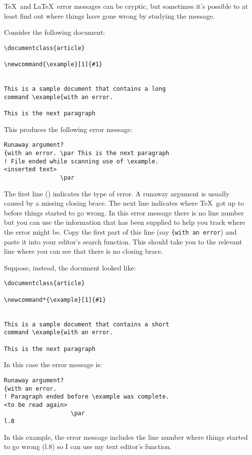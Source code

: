 \TeX\ and \LaTeX\ error messages can be cryptic, but sometimes it's
possible to at least find out where things have gone wrong by
studying the message. 

Consider the following document: 
\begin{verbatim}
\documentclass{article}

\newcommand{\example}[1]{#1}


This is a sample document that contains a long 
command \example{with an error.

This is the next paragraph

\end{verbatim}
This produces the following error message: 
\begin{verbatim}
Runaway argument?
{with an error. \par This is the next paragraph 
! File ended while scanning use of \example.
<inserted text>
                \par
\end{verbatim}
The first line () indicates the type of error.
A runaway argument is usually caused by a missing closing brace. The
next line indicates where \TeX\ got up to before things started to
go wrong. In this error message there is no line number but you can
use the information that has been supplied to help you track where
the error might be. Copy the first part of this line (say
\verb|{with an error|) and paste it into your editor's search
function. This should take you to the relevant line where you can
see that there is no closing brace.

Suppose, instead, the document looked like: 
\begin{verbatim}
\documentclass{article}

\newcommand*{\example}[1]{#1}


This is a sample document that contains a short 
command \example{with an error.

This is the next paragraph

\end{verbatim}
In this case the error message is:
\begin{verbatim}
Runaway argument?
{with an error.
! Paragraph ended before \example was complete.
<to be read again>
                   \par
l.8
\end{verbatim}
In this example, the error message includes the line number where
things started to go wrong (l.8) so I can use my text editor's  function. 

